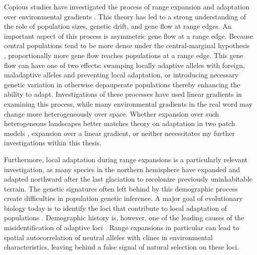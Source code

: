 Copious studies have investigated the process of range expansion and adaptation over environmental gradients \citep{Kirkpatrick:1997, Barton:2001, Bridle:2010, Polechova:2015, GarciaRamos:1997}. This theory has led to a strong understanding of the role of population sizes, genetic drift, and gene flow at range edges. An important aspect of this process is asymmetric gene flow at a range edge. Because central populations tend to be more dense under the central-marginal hypothesis \citep{Brown:1984, Eckert:2008}, proportionally more gene flow reaches populations at a range edge. This gene flow can have one of two effects: swamping locally adaptive alleles with foreign, maladaptive alleles and preventing local adaptation, or introducing necessary genetic variation in otherwise depauperate populations thereby enhancing the ability to adapt. Investigations of these processes have used linear gradients in examining this process, while many environmental gradients in the real word may change more heterogeneously over space. Whether expansion over such heterogeneous landscapes better matches theory on adaptation in two patch models \citep{Gomulkiewicz:1995, Ronce:2001, Holt:1997, Gomulkiewicz:1999}, expansion over a linear gradient, or neither necessitates my further investigations within this thesis.

Furthermore, local adaptation during range expansions is a particularly relevant investigation, as many species in the northern hemisphere have expanded and adapted northward after the last glaciation to recolonize previously uninhabitable terrain. The genetic signatures often left behind by this demographic process create difficulties in population genetic inference. A major goal of evolutionary biology today is to identify the loci that contribute to local adaptation of populations \citep{Savolainen:2013, Whitlock:2015, LeCorre:2012, Coop:2010}. Demographic history is, however, one of the leading causes of the misidentification of adaptive loci \citep{Whitlock:2015}. Range expansions in particular can lead to spatial autocorrelation of neutral alleles with clines in environmental characteristics, leaving behind a false signal of natural selection on these loci.

